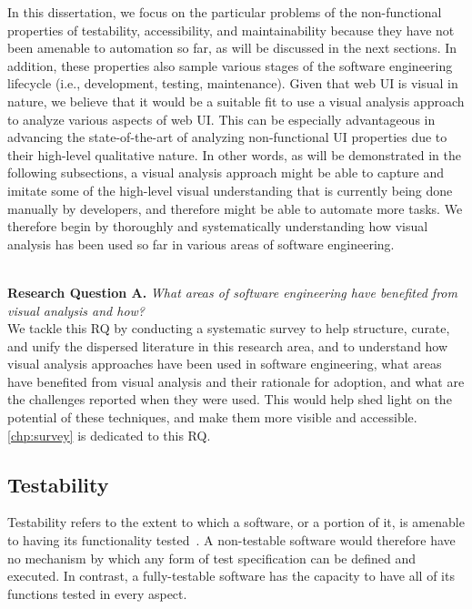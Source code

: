 In this dissertation, we focus on the particular problems of the non-functional properties of 
testability, accessibility, and maintainability 
because they have not been amenable to automation so far, as will be discussed in the next sections.  
In addition, these properties also sample various stages of the software engineering lifecycle (i.e., development, testing, maintenance). 
Given that web UI is visual in nature, we believe that it would be 
a suitable fit to use a visual analysis approach to analyze various aspects 
of web UI. This can be especially advantageous in advancing the state-of-the-art 
of analyzing non-functional UI properties due to their high-level qualitative nature. 
In other words, as will be demonstrated in the following subsections, a visual analysis approach might be able to capture and imitate some of the 
high-level visual understanding that is currently being done manually by developers, and therefore might be able to automate more tasks. 
We therefore begin by thoroughly and systematically understanding how visual analysis has been used so far in various areas of software engineering. 


\ \\ 
\textbf{Research Question A.}
\textit{What areas of software engineering have benefited from visual analysis 
	and how?}
\\ 
We tackle this RQ by conducting a systematic survey to help structure, 
curate, and unify the dispersed literature in this research area,
and to understand how visual analysis approaches have
been used in software engineering, what areas have benefited from visual 
analysis and their rationale for adoption, 
and what are the challenges reported when they were used. 
This would help shed light on the potential of these 
techniques, and make them more visible and accessible. 
\autoref{chp:survey} is dedicated to this RQ. 
 
\subsection{Testability}\label{subsec:testability}
Testability refers to the extent to which a software, or a portion of it,
is amenable to having its functionality tested~\cite{garousi2019survey, 
rodriguez2014general}. 
A non-testable software would therefore have no mechanism by which any form 
of test specification can be defined and executed. 
In contrast, a fully-testable software has the capacity to have all of its 
functions tested in every aspect.   

